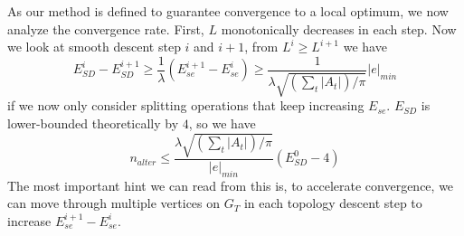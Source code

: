 As our method is defined to guarantee convergence to a local optimum, we now analyze the convergence rate. First, $L$ monotonically decreases in each step. Now we look at smooth descent step $i$ and $i+1$, from $L^i \geq L^{i+1}$ we have
\[ E^i_{SD} - E^{i+1}_{SD} \geq \frac{1}{\lambda} (E^{i+1}_{se} - E^i_{se}) \geq \frac{1}{\lambda\sqrt{(\sum_t |A_t|)/\pi}} |e|_{min} \]
if we now only consider splitting operations that keep increasing $E_{se}$. $E_{SD}$ is lower-bounded theoretically by $4$, so we have
\[ n_{alter} \leq \frac{\lambda\sqrt{(\sum_t |A_t|)/\pi}}{|e|_{min}} (E^0_{SD} - 4) \]
The most important hint we can read from this is, to accelerate convergence, we can move through multiple vertices on $G_T$ in each topology descent step to increase $E^{i+1}_{se} - E^i_{se}$.

 